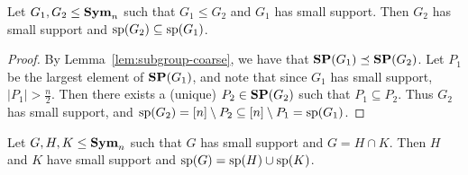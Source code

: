 \documentclass[../paper.tex]{subfiles}
\begin{document}
\begin{lem}
  Let $G_1, G_2 \leq \text{\textbf{Sym}}_n$ such that $G_1 \leq G_2$ and $G_1$ has small
  support. Then $G_2$ has small support and $\text{sp}(G_2) \subseteq \text{sp}(G_1)$.
  \label{lem:support-containment}
\end{lem}
\begin{proof}
  By Lemma~\ref{lem:subgroup-coarse}, we have that $\text{\textbf{SP}}(G_1) \preceq \text{\textbf{SP}}(G_2)$.
  Let $P_1$ be the largest element of $\text{\textbf{SP}}(G_1)$, and note that since $G_1$ has
  small support, $\vert P_1 \vert > \frac{n}{2}$. Then there exists a (unique)
  $P_2 \in \text{\textbf{SP}}(G_2)$ such that $P_1 \subseteq P_2$. Thus $G_2$ has small
  support, and $\text{sp}(G_2) = [n] \setminus P_2 \subseteq [n] \setminus P_1 =
  \text{sp}(G_1)$.
\end{proof}

\begin{lem}
  Let $G, H, K \leq \text{\textbf{Sym}}_n$ such that $G$ has small support and $G = H \cap K$.
  Then $H$ and $K$ have small support and $\text{sp}(G) = \text{sp}(H) \cup
  \text{sp}(K)$.
  \label{lem:row-column-supports-well-behaved}
\end{lem}
\end{document}
